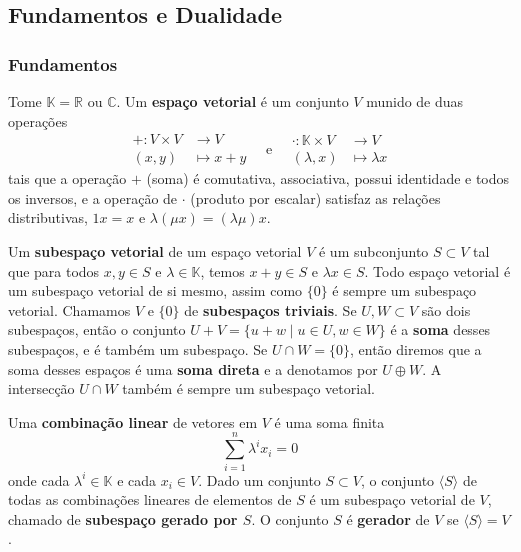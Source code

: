\subsection{Fundamentos e Dualidade}

\subsubsection*{Fundamentos}

Tome $\mathbb{K} = \mathbb{R}$ ou $\mathbb{C}$. Um \textbf{espaço vetorial} é um conjunto $V$ munido de duas operações \begin{equation}
    \begin{split}
        + \colon V \times V &\to V \\ (x,y) &\mapsto x + y
    \end{split} \quad \text{e} \quad \begin{split}
        \cdot \colon \mathbb{K} \times V &\to V \\ (\lambda,x) &\mapsto \lambda x
    \end{split}
\end{equation} tais que a operação $+$ (soma) é comutativa, associativa, possui identidade e todos os inversos, e a operação de $\cdot$ (produto por escalar) satisfaz as relações distributivas, $1x = x$ e $\lambda(\mu x) = (\lambda\mu)x$.

Um \textbf{subespaço vetorial} de um espaço vetorial $V$ é um subconjunto $S \subset V$ tal que para todos $x, y \in S$ e $\lambda \in \mathbb{K}$, temos $x + y \in S$ e $\lambda x \in S$. Todo espaço vetorial é um subespaço vetorial de si mesmo, assim como $\{0\}$ é sempre um subespaço vetorial. Chamamos $V$ e $\{0\}$ de \textbf{subespaços triviais}. Se $U, W \subset V$ são dois subespaços, então o conjunto $U + V = \{u + w \mid u \in U, w \in W\}$ é a \textbf{soma} desses subespaços, e é também um subespaço. Se $U \cap W = \{0\}$, então diremos que a soma desses espaços é uma \textbf{soma direta} e a denotamos por $U \oplus W$. A intersecção $U \cap W$ também é sempre um subespaço vetorial.

Uma \textbf{combinação linear} de vetores em $V$ é uma soma finita \begin{equation}
    \sum_{i = 1}^n \lambda^i x_i = 0
\end{equation} onde cada $\lambda^i \in \mathbb{K}$ e cada $x_i \in V$. Dado um conjunto $S \subset V$, o conjunto $\langle S \rangle$ de todas as combinações lineares de elementos de $S$ é um subespaço vetorial de $V$, chamado de \textbf{subespaço gerado por $S$}. O conjunto $S$ é \textbf{gerador} de $V$ se $\langle S \rangle = V$.

